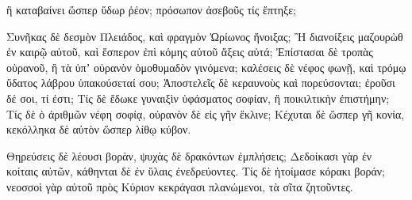 {ἣ καταβαίνει ὥσπερ ὕδωρ ῥέον; πρόσωπον ἀσεβοῦς τίς ἔπτηξε;
\par }{\PP {}Συνῆκας δὲ δεσμὸν Πλειάδος, καὶ φραγμὸν Ὠρίωνος ἤνοιξας;
Ἢ διανοίξεις μαζουρὼθ ἐν καιρῷ αὐτοῦ, καὶ ἕσπερον ἐπὶ κόμης αὐτοῦ ἄξεις αὐτά;
Ἐπίστασαι δὲ τροπὰς οὐρανοῦ, ἢ τὰ ὑπʼ οὐρανὸν ὁμοθυμαδὸν γινόμενα;
καλέσεις δὲ νέφος φωνῇ, καὶ τρόμῳ ὕδατος λάβρου ὑπακούσεταί σου;
Ἀποστελεῖς δὲ κεραυνοὺς καὶ πορεύσονται; ἐροῦσι δέ σοι, τί ἐστι;
Τίς δὲ ἔδωκε γυναιξὶν ὑφάσματος σοφίαν, ἢ ποικιλτικὴν ἐπιστήμην;
Τίς δὲ ὁ ἀριθμῶν νέφη σοφίᾳ, οὐρανὸν δὲ εἰς γῆν ἔκλινε;
Κέχυται δὲ ὥσπερ γῆ κονία, κεκόλληκα δὲ αὐτὸν ὥσπερ λίθῳ κύβον.
\par }{\PP {}Θηρεύσεις δὲ λέουσι βορὰν, ψυχὰς δὲ δρακόντων ἐμπλήσεις;
Δεδοίκασι γὰρ ἐν κοίταις αὐτῶν, κάθηνται δὲ ἐν ὕλαις ἐνεδρεύοντες.
Τίς δὲ ἡτοίμασε κόρακι βοράν; νεοσσοὶ γὰρ αὐτοῦ πρὸς Κύριον κεκράγασι πλανώμενοι, τὰ σῖτα ζητοῦντες.

}
